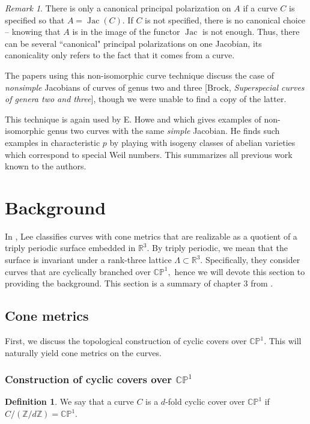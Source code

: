 \documentclass[12pt,reqno]{amsart}
\DeclareMathOperator{\Jac}{Jac}
\newcommand{\Z}{\mathbb{Z}}
\newcommand{\R}{\mathbb{R}}
\theoremstyle{definition}
\newtheorem{defn}{Definition}
\theoremstyle{remark}
\newtheorem*{remark}{Remark}
\begin{document}
\begin{remark} There is only a canonical principal polarization on $A$ if a curve $C$ is specified so that $A = \Jac(C).$ If $C$ is not specified, there is no canonical choice -- knowing that $A$ is in the image of the functor $\Jac$ is not enough. Thus, there can be several ``canonical" principal polarizations on one Jacobian, its canonicality only refers to the fact that it comes from a curve. \end{remark}

The papers using this non-isomorphic curve technique discuss the case of \textit{nonsimple} Jacobians of curves of genus two \cite{iko} and three [Brock, \textit{Superspecial curves of genera two and three}], though we were unable to find a copy of the latter. 

This technique is again used by E. Howe \cite{howe1} and \cite{howe2} which gives examples of non-isomorphic genus two curves with the same \textit{simple} Jacobian. He finds such examples in characteristic $p$ by playing with isogeny classes of abelian varieties which correspond to special Weil numbers. This summarizes all previous work known to the authors.


\section{Background}
\label{sec: dthesis}
In \cite{dthesis}, Lee classifies curves with cone metrics that are realizable as a quotient of a triply periodic surface embedded in $\R^3.$ By triply periodic, we mean that the surface is invariant under a rank-three lattice $\Lambda \subset \R^3.$ Specifically, they consider curves that are cyclically branched over $\mathbb{C}\mathbb{P}^1,$ hence we will devote this section to providing the background. This section is a summary of chapter 3 from \cite{dthesis}. 

\subsection{Cone metrics}
First, we discuss the topological construction of cyclic covers over $\mathbb{C}\mathbb{P}^1.$ This will naturally yield cone metrics on the curves.

\subsubsection*{Construction of cyclic covers over $\mathbb{C}\mathbb{P}^1$}
\begin{defn} We say that a curve $C$ is a $d$-fold cyclic cover over $\mathbb{C}\mathbb{P}^1$ if $C / (\Z/ d \Z) = \mathbb{C}\mathbb{P}^1.$ \end{defn}
\end{document}
